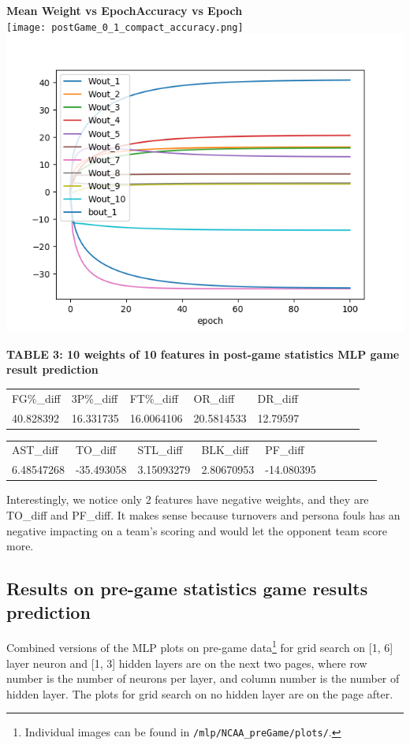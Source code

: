 \documentclass[12pt]{article}
\begin{document}
\textbf{Mean Weight vs Epoch\qquad \qquad Accuracy vs Epoch} \\
\texttt{[image: postGame\_0\_1\_compact\_accuracy.png]} 
\includegraphics[scale=0.4]{postGame_0_1_detailed_weights.png} 

\textbf{TABLE 3: 10 weights of 10 features in post-game statistics MLP game result prediction }

\begin{table}[h]
\begin{tabular}{llllllllll}
FG\%\_diff & 3P\%\_diff & FT\%\_diff  & OR\_diff   & DR\_diff \\
40.828392  & 16.331735  & 16.0064106  & 20.5814533 & 12.79597 
\end{tabular}
\end{table}

\begin{table}[h]
\begin{tabular}{llllllllll}
AST\_diff &TO\_diff & STL\_diff & BLK\_diff& PF\_diff\\
6.48547268  &-35.493058 & 3.15093279 & 2.80670953 & -14.080395
\end{tabular}
\end{table}

Interestingly, we notice only 2 features have negative weights, and they are TO\_diff and PF\_diff. It makes sense because turnovers and persona fouls has an negative impacting on a team's scoring and would let the opponent team score more.

\subsection{Results on pre-game statistics game results prediction}
\quad Combined versions of the MLP plots on pre-game data\footnote{Individual images can be found in \texttt{/mlp/NCAA\_preGame/plots/}.} for grid search on [1, 6] layer neuron and [1, 3] hidden layers are on the next two pages, where row number is the number of neurons per layer, and column number is the number of hidden layer. The plots for grid search on no hidden layer are on the page after. \newpage
\end{document}

